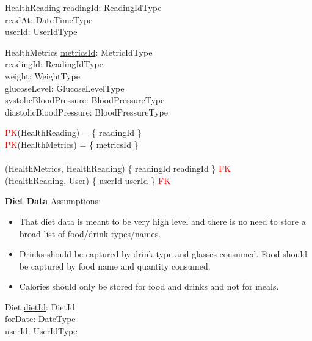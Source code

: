 \documentclass{article}
\begin{document}
\begin{schema}{HealthReading}
	\underline{readingId}: ReadingIdType \\
    readAt: DateTimeType \\
    userId: UserIdType \\
\end{schema}
\vspace{-0.75cm}
\begin{schema}{HealthMetrics}
    \underline{metricsId}: MetricIdType \\
    readingId: ReadingIdType \\
    weight: WeightType \\ 
    glucoseLevel: GlucoseLevelType \\
    systolicBloodPressure: BloodPressureType \\
    diastolicBloodPressure: BloodPressureType \\
\end{schema}
\begin{zed}
\textcolor{red}{PK}(HealthReading) = \{ readingId \} \\ 
\textcolor{red}{PK}(HealthMetrics) = \{ metricsId \} \\
\newline \\ 
(HealthMetrics, HealthReading) \mapsto \{ readingId \mapsto readingId \} \in \textcolor{red}{FK} \\
(HealthReading, User) \mapsto \{ userId \mapsto userId \} \in \textcolor{red}{FK} \\
\end{zed}
\newline
\textbf{Diet Data}
\newline \newline Assumptions:
\begin{itemize}
  \item That diet data is meant to be very high level and there is no need to store a broad list of food/drink types/names. 
  \item Drinks should be captured by drink type and glasses consumed. Food should be captured by food name and quantity consumed.
  \item Calories should only be stored for food and drinks and not for meals. 
\end{itemize}
\begin{schema}{Diet}
    \underline{dietId}: DietId \\
    forDate: DateType \\
    userId: UserIdType \\
\end{schema}
\end{document}
